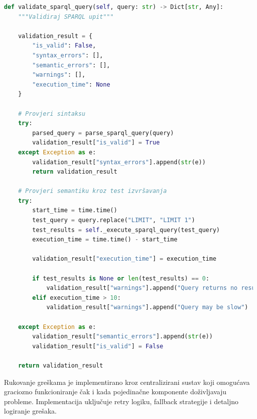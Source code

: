 \begin{lstlisting}[language=Python, caption=Implementacija validacije SPARQL upita]
def validate_sparql_query(self, query: str) -> Dict[str, Any]:
    """Validiraj SPARQL upit"""
    
    validation_result = {
        "is_valid": False,
        "syntax_errors": [],
        "semantic_errors": [],
        "warnings": [],
        "execution_time": None
    }
    
    # Provjeri sintaksu
    try:
        parsed_query = parse_sparql_query(query)
        validation_result["is_valid"] = True
    except Exception as e:
        validation_result["syntax_errors"].append(str(e))
        return validation_result
    
    # Provjeri semantiku kroz test izvršavanja
    try:
        start_time = time.time()
        test_query = query.replace("LIMIT", "LIMIT 1")
        test_results = self._execute_sparql_query(test_query)
        execution_time = time.time() - start_time
        
        validation_result["execution_time"] = execution_time
        
        if test_results is None or len(test_results) == 0:
            validation_result["warnings"].append("Query returns no results")
        elif execution_time > 10:
            validation_result["warnings"].append("Query may be slow")
            
    except Exception as e:
        validation_result["semantic_errors"].append(str(e))
        validation_result["is_valid"] = False
    
    return validation_result
\end{lstlisting}

Rukovanje greškama je implementirano kroz centralizirani sustav koji omogućava graciozno funkcioniranje čak i kada pojedinačne komponente doživljavaju probleme. Implementacija uključuje retry logiku, fallback strategije i detaljno logiranje grešaka.

